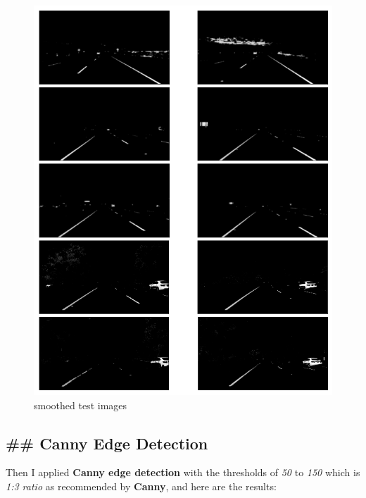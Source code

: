 \documentclass[11pt]{article}
\makeatletter
\def\maxwidth{\ifdim\Gin@nat@width>\linewidth\linewidth
    \else\Gin@nat@width\fi}
\let\Oldincludegraphics\includegraphics
\renewcommand{\includegraphics}[1]{\Oldincludegraphics[width=.8\maxwidth]{#1}}
\makeatother
\begin{document}
\begin{figure}
\centering
\includegraphics{test_images_output/smooth_test_images.png}
\caption{smoothed test images}
\end{figure}

\hypertarget{canny-edge-detection}{%
\subsection{\#\# Canny Edge Detection}\label{canny-edge-detection}}

Then I applied \textbf{Canny edge detection} with the thresholds of
\emph{50} to \emph{150} which is \emph{1:3 ratio} as recommended by
\textbf{Canny}, and here are the results:
\end{document}
